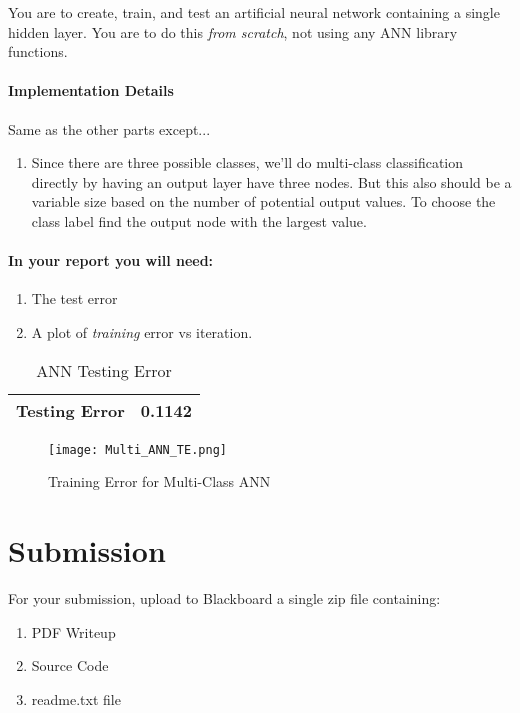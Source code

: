 \documentclass[12pt]{article}
\begin{document}
\noindent
You are to create, train, and test an artificial neural network containing a single hidden layer.  You are to do this \emph{from scratch}, not using any ANN library functions.

\paragraph{Implementation Details}
Same as the other parts except...
\begin{enumerate}
\item Since there are three possible classes, we'll do multi-class classification directly by having an output layer have three nodes.  But this also should be a variable size based on the number of potential output values.   To choose the class label find the output node with the largest value.
\end{enumerate}


\paragraph{In your report you will need:}
\begin{enumerate}
\item The test error
\item A plot of \emph{training} error vs iteration.
\end{enumerate}


\begin{table}[h]
\begin{center}
\begin{tabular}{|l|l|}
\hline
Testing Error & 0.1142\\
\hline
\end{tabular}
\caption{ANN Testing Error}
\end{center}
\end{table}


\begin{figure}[H]
\begin{center}
\texttt{[image: Multi\_ANN\_TE.png]}
\caption{Training Error for Multi-Class ANN}
\end{center}
\end{figure}


\newpage
\section*{Submission}
For your submission, upload to Blackboard a single zip file containing:

\begin{enumerate}
\item PDF Writeup
\item Source Code
\item readme.txt file
\end{enumerate}
\end{document}
